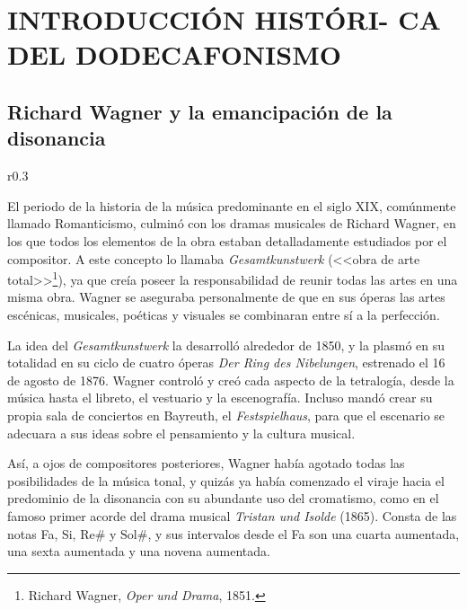 	\chapter[INTRODUCCIÓN HISTÓRICA DEL DODECAFONISMO]{INTRODUCCIÓN HISTÓRI- CA DEL DODECAFONISMO}
	\section{Richard Wagner y la emancipación de la disonancia}
		\begin{wrapfigure}{r}{0.3\textwidth}
			\captionsetup{justification=centering, font=footnotesize}
			\vspace{-\bigskipamount}
		\end{wrapfigure}
		El periodo de la historia de la música predominante en el siglo XIX, comúnmente llamado Romanticismo, culminó con los dramas musicales de Richard Wagner, en los que todos los elementos de la obra estaban detalladamente estudiados por el compositor. A este concepto lo llamaba \emph{Gesamtkunstwerk} (<<obra de arte total>>\footnote{Richard Wagner, \emph{Oper und Drama}, 1851.}), ya que creía poseer la responsabilidad de reunir todas las artes en una misma obra. Wagner se aseguraba personalmente de que en sus óperas las artes escénicas, musicales, poéticas y visuales se combinaran entre sí a la perfección.
	
		La idea del \emph{Gesamtkunstwerk} la desarrolló alrededor de 1850, y la plasmó en su totalidad en su ciclo de cuatro óperas \emph{Der Ring des Nibelungen}, estrenado el 16 de agosto de 1876. Wagner controló y creó cada aspecto de la tetralogía, desde la música hasta el libreto, el vestuario y la escenografía. Incluso mandó crear su propia sala de conciertos en Bayreuth, el \emph{Festspielhaus}, para que el escenario se adecuara a sus ideas sobre el pensamiento y la cultura musical.
	
		Así, a ojos de compositores posteriores, Wagner había agotado todas las posibilidades de la música tonal, y quizás ya había comenzado el viraje hacia el predominio de la disonancia con su abundante uso del cromatismo, como en el famoso primer acorde del drama musical \emph{Tristan und Isolde} (1865). Consta de las notas Fa, Si, $\text{Re\#}$ y $\text{Sol\#}$, y sus intervalos desde el Fa son una cuarta aumentada, una sexta aumentada y una novena aumentada.
		
